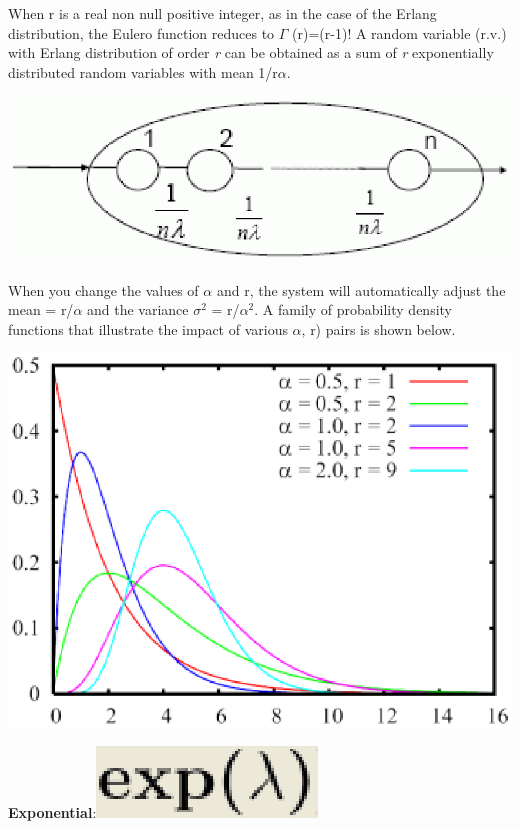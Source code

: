 When r is a real non null positive integer, as in the  case of the Erlang distribution,
the Eulero function reduces  to $\Gamma$ (r)=(r-1)!
A random variable (r.v.) with Erlang distribution  of order \emph{r} can be obtained as a sum of \emph{r} exponentially  distributed random variables with mean 1/r$\alpha$.
\begin{center}
\includegraphics[scale=.5]{img/jsim/erlang2.eps}
\end{center}
When you change the values of $\alpha$ and r, the system  will automatically adjust the mean = r/$\alpha$ and the variance $\sigma ^ 2$ = r/$\alpha ^ 2$.
A family of probability density functions that illustrate the impact of various $\alpha$, r) pairs is shown below.\\
\begin{center}
\includegraphics[scale=.5]{img/jsim/erl_pdf.eps}
\end{center}
\textbf{Exponential}:\includegraphics[scale=.5]{img/jsim/exponential_f.eps}\\\\
